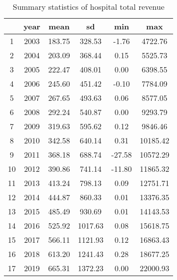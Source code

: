 \begin{table}[ht]
\centering
\begin{tabular}{cccccc}
  \hline
 & year & mean & sd & min & max \\ 
  \hline
1 & 2003 & 183.75 & 328.53 & -1.76 & 4722.76 \\ 
  2 & 2004 & 203.09 & 368.44 & 0.15 & 5525.73 \\ 
  3 & 2005 & 222.47 & 408.01 & 0.00 & 6398.55 \\ 
  4 & 2006 & 245.60 & 451.42 & -0.10 & 7784.09 \\ 
  5 & 2007 & 267.65 & 493.63 & 0.06 & 8577.05 \\ 
  6 & 2008 & 292.24 & 540.87 & 0.00 & 9293.79 \\ 
  7 & 2009 & 319.63 & 595.62 & 0.12 & 9846.46 \\ 
  8 & 2010 & 342.58 & 640.14 & 0.31 & 10185.42 \\ 
  9 & 2011 & 368.18 & 688.74 & -27.58 & 10572.29 \\ 
  10 & 2012 & 390.86 & 741.14 & -11.80 & 11865.32 \\ 
  11 & 2013 & 413.24 & 798.13 & 0.09 & 12751.71 \\ 
  12 & 2014 & 444.87 & 860.33 & 0.01 & 13376.35 \\ 
  13 & 2015 & 485.49 & 930.69 & 0.01 & 14143.53 \\ 
  14 & 2016 & 525.92 & 1017.63 & 0.08 & 15618.75 \\ 
  15 & 2017 & 566.11 & 1121.93 & 0.12 & 16863.43 \\ 
  16 & 2018 & 613.20 & 1241.43 & 0.28 & 18677.25 \\ 
  17 & 2019 & 665.31 & 1372.23 & 0.00 & 22000.93 \\ 
   \hline
\end{tabular}
\caption{Summary statistics of hospital total revenue} 
\end{table}
